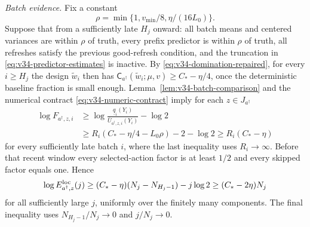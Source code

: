 \documentclass{article}
\theoremstyle{plain}
\theoremstyle{definition}
\begin{document}
\emph{Batch evidence.}
Fix a constant
\begin{equation}
 \rho=\min\{1,v_{\min}/8,\eta/(16L_0)\}.
 \label{eq:v34-batch-radius}
\end{equation}
Suppose that from a sufficiently late $H_j$ onward: all batch means
and centered variances are within $\rho$ of truth, every prefix
predictor is within $\rho$ of truth, all refreshes satisfy the
previous good-refresh condition, and the truncation in
\eqref{eq:v34-predictor-estimates} is inactive. By
\eqref{eq:v34-domination-repaired}, for every $i\ge H_j$ the design
$\widetilde w_i$ then has
$\mathsf C_{a^\dagger}(\widetilde w_i;\mu,v)
\ge C_*-\eta/4$, once the deterministic baseline fraction is small
enough. Lemma~\ref{lem:v34-batch-comparison} and the numerical
contract \eqref{eq:v34-numeric-contract} imply for each $z\in J_{a^\dagger}$
\begin{align*}
 \log F_{a^\dagger,z,i}
 &\ge\log\frac{\underline q_i(Y_i)}{\overline U_{a^\dagger,z,i}(Y_i)}-\log2\\
 &\ge R_i(C_*-\eta/4-L_0\rho)-2-\log2
 \ge R_i(C_*-\eta)
\end{align*}
for every sufficiently late batch $i$, where the last inequality uses
$R_i\to\infty$. Before that recent window every selected-action factor
is at least $1/2$ and every skipped factor equals one. Hence
\[
 \log E_{a^\dagger,z}^{\rm loc}(j)
 \ge(C_*-\eta)(N_j-N_{H_j-1})-j\log2
 \ge(C_*-2\eta)N_j
\]
for all sufficiently large $j$, uniformly over the finitely many
components. The final inequality uses
$N_{H_j-1}/N_j\to0$ and $j/N_j\to0$.
\end{document}
